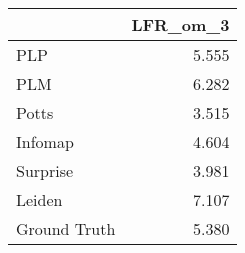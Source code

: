\begin{tabular}{lr}
\toprule
{} & LFR_om_3 \\
\midrule
PLP          &    5.555 \\
PLM          &    6.282 \\
Potts        &    3.515 \\
Infomap      &    4.604 \\
Surprise     &    3.981 \\
Leiden       &    7.107 \\
Ground Truth &    5.380 \\
\bottomrule
\end{tabular}
